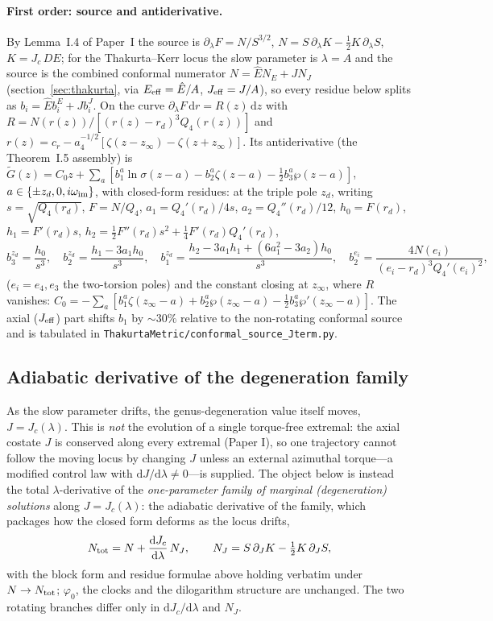 \documentclass[12pt]{iopart}
\theoremstyle{plain}
\theoremstyle{definition}
\theoremstyle{remark}
\newcommand{\Ehat}{\hat E}
\newcommand{\Jc}{J_{c}}
\newcommand{\dd}{\mathrm{d}}
\begin{document}
\paragraph{First order: source and antiderivative.}
By Lemma~I.4 of Paper~I the source is $\partial_\lambda F=N/S^{3/2}$,
$N=S\,\partial_\lambda K-\tfrac12K\,\partial_\lambda S$, $K=\Jc\,DE$; for the
Thakurta--Kerr locus the slow parameter is $\lambda=A$ and the source is the
combined conformal numerator $N=\Ehat N_E+J N_J$ (section~\ref{sec:thakurta}, via
$E_{\rm eff}=\Ehat/A$, $J_{\rm eff}=J/A$), so every residue below splits as
$b_i=\Ehat b_i^{E}+J b_i^{J}$. On the curve $\partial_\lambda F\,\dd r=R(z)\,\dd z$
with $R=N(r(z))/[(r(z)-r_d)^3Q_4(r(z))]$ and $r(z)=c_r-a_4^{-1/2}[\zeta(z-z_\infty)-
\zeta(z+z_\infty)]$. Its antiderivative (the Theorem~I.5 assembly) is
$\tilde G(z)=C_0 z+\sum_{a}[b_1^a\ln\sigma(z-a)-b_2^a\zeta(z-a)-\tfrac12 b_3^a
\wp(z-a)]$, $a\in\{\pm z_d,0,i\omega_{\rm im}\}$, with closed-form residues: at the
triple pole $z_d$, writing $s=\sqrt{Q_4(r_d)}$, $F=N/Q_4$, $a_1=Q_4'(r_d)/4s$,
$a_2=Q_4''(r_d)/12$, $h_0=F(r_d)$, $h_1=F'(r_d)s$,
$h_2=\tfrac12F''(r_d)s^2+\tfrac14F'(r_d)Q_4'(r_d)$,
\begin{equation}
b_3^{z_d}=\frac{h_0}{s^3},\quad b_2^{z_d}=\frac{h_1-3a_1h_0}{s^3},\quad
b_1^{z_d}=\frac{h_2-3a_1h_1+(6a_1^2-3a_2)h_0}{s^3},\quad
b_2^{e_i}=\frac{4N(e_i)}{(e_i-r_d)^3Q_4'(e_i)^2},
\end{equation}
($e_i=e_4,e_3$ the two-torsion poles) and the constant closing at $z_\infty$, where
$R$ vanishes: $C_0=-\sum_a[b_1^a\zeta(z_\infty-a)+b_2^a\wp(z_\infty-a)-\tfrac12
b_3^a\wp'(z_\infty-a)]$. The axial ($J_{\rm eff}$) part shifts $b_1$ by
$\sim\!30\%$ relative to the non-rotating conformal source and is tabulated in
\texttt{ThakurtaMetric/conformal\_source\_Jterm.py}.

\subsection{Adiabatic derivative of the degeneration family}
\label{app:tracking}
As the slow parameter drifts, the genus-degeneration value itself moves,
$J=\Jc(\lambda)$. This is \emph{not} the evolution of a single torque-free extremal:
the axial costate $J$ is conserved along every extremal
(Paper I), so one trajectory cannot follow the moving locus by
changing $J$ unless an external azimuthal torque---a modified control law with
$\dd J/\dd\lambda\neq0$---is supplied. The object below is instead the total
$\lambda$-derivative of the \emph{one-parameter family of marginal (degeneration)
solutions} along $J=\Jc(\lambda)$: the adiabatic derivative of the family, which
packages how the closed form deforms as the locus drifts,
\begin{equation}
N_{\rm tot}=N+\frac{\dd\Jc}{\dd\lambda}\,N_J,\qquad
N_J=S\,\partial_JK-\tfrac12K\,\partial_JS,
\label{eq:Ntot-track}
\end{equation}
with the block form and residue formulae above holding verbatim under $N\to N_{\rm tot}$;
$\varphi_0$, the clocks and the dilogarithm structure are unchanged. The two rotating
branches differ only in $\dd\Jc/\dd\lambda$ and $N_J$.
\end{document}

